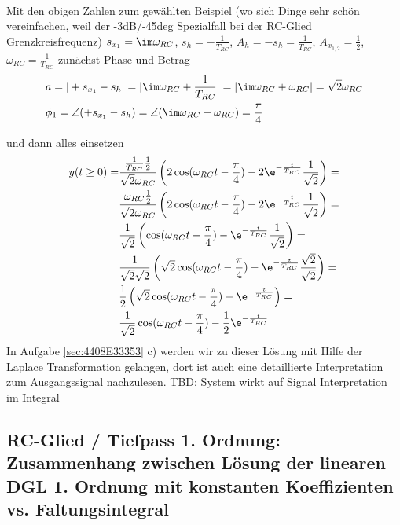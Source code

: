 \begin{ExCalc}
\begin{align}
\end{align}
%
Mit den obigen Zahlen zum gewählten Beispiel (wo sich Dinge sehr schön vereinfachen, weil der -3dB/-45deg Spezialfall bei der RC-Glied Grenzkreisfrequenz) $s_{x_{1}} = \im\omega_{RC}$, $s_h = -\frac{1}{T_{RC}}$, $A_h = -s_h = \frac{1}{T_{RC}}$, $A_{x_{1,2}}=\frac{1}{2}$, $\omega_{RC} = \frac{1}{T_{RC}}$
zunächst Phase und Betrag
\begin{align}
&a = |+s_{x_{1}}-s_h| = |\im\omega_{RC} + \frac{1}{T_{RC}}| = |\im\omega_{RC} + \omega_{RC}| = \sqrt{2}\omega_{RC}\\
&\phi_1 = \angle (+s_{x_{1}}-s_h) = \angle (\im\omega_{RC} + \omega_{RC}) = \frac{\pi}{4}
\end{align}
\end{ExCalc}
\begin{Loesung}
und dann alles einsetzen
\begin{align}
y(t \geq 0) = & \frac{\frac{1}{T_{RC}} \frac{1}{2}}{\sqrt{2}\omega_{RC}} \left(2\cos(\omega_{RC} t-\frac{\pi}{4})-2\e^{-\frac{t}{T_{RC}}}\frac{1}{\sqrt{2}}\right)=\\
& \frac{\omega_{RC} \frac{1}{2}}{\sqrt{2}\omega_{RC}} \left(2\cos(\omega_{RC} t-\frac{\pi}{4})-2\e^{-\frac{t}{T_{RC}}}\frac{1}{\sqrt{2}}\right)=\\
& \frac{1}{\sqrt{2}} \left(\cos(\omega_{RC} t-\frac{\pi}{4})-\e^{-\frac{t}{T_{RC}}}\frac{1}{\sqrt{2}}\right)=\\
& \frac{1}{\sqrt{2} \sqrt{2}} \left(\sqrt{2}\cos(\omega_{RC} t-\frac{\pi}{4})-\e^{-\frac{t}{T_{RC}}}\frac{\sqrt{2}}{\sqrt{2}}\right)=\\
& \frac{1}{2} \left(\sqrt{2}\cos(\omega_{RC} t-\frac{\pi}{4})-\e^{-\frac{t}{T_{RC}}}\right)=\\
& \frac{1}{\sqrt{2}}\cos(\omega_{RC} t-\frac{\pi}{4})-\frac{1}{2}\e^{-\frac{t}{T_{RC}}}
\end{align}
In Aufgabe \ref{sec:4408E33353} c) werden wir zu dieser Lösung mit Hilfe der Laplace Transformation gelangen, dort ist auch eine detaillierte Interpretation zum Ausgangssignal nachzulesen.
TBD: System wirkt auf Signal Interpretation im Integral
\end{Loesung}

\subsection*{RC-Glied / Tiefpass 1. Ordnung: Zusammenhang zwischen Lösung der linearen DGL 1. Ordnung mit konstanten Koeffizienten vs. Faltungsintegral}
\newcommand\TRC{T_\text{RC}}

